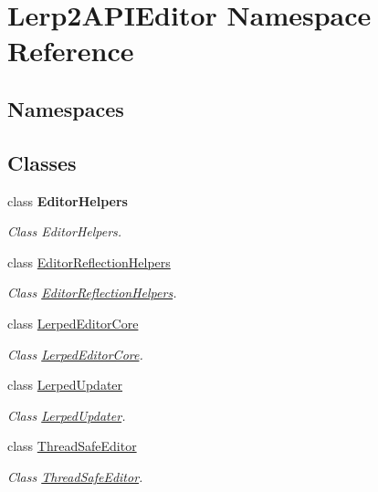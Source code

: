 \hypertarget{namespace_lerp2_a_p_i_editor}{}\section{Lerp2\+A\+P\+I\+Editor Namespace Reference}
\label{namespace_lerp2_a_p_i_editor}
\subsection*{Namespaces}
\begin{DoxyCompactItemize}
\end{DoxyCompactItemize}
\subsection*{Classes}
\begin{DoxyCompactItemize}
\item 
class {\bfseries Editor\+Helpers}
\begin{DoxyCompactList}\small\item\em Class Editor\+Helpers. \end{DoxyCompactList}\item 
class \hyperlink{class_lerp2_a_p_i_editor_1_1_editor_reflection_helpers}{Editor\+Reflection\+Helpers}
\begin{DoxyCompactList}\small\item\em Class \hyperlink{class_lerp2_a_p_i_editor_1_1_editor_reflection_helpers}{Editor\+Reflection\+Helpers}. \end{DoxyCompactList}\item 
class \hyperlink{class_lerp2_a_p_i_editor_1_1_lerped_editor_core}{Lerped\+Editor\+Core}
\begin{DoxyCompactList}\small\item\em Class \hyperlink{class_lerp2_a_p_i_editor_1_1_lerped_editor_core}{Lerped\+Editor\+Core}. \end{DoxyCompactList}\item 
class \hyperlink{class_lerp2_a_p_i_editor_1_1_lerped_updater}{Lerped\+Updater}
\begin{DoxyCompactList}\small\item\em Class \hyperlink{class_lerp2_a_p_i_editor_1_1_lerped_updater}{Lerped\+Updater}. \end{DoxyCompactList}\item 
class \hyperlink{class_lerp2_a_p_i_editor_1_1_thread_safe_editor}{Thread\+Safe\+Editor}
\begin{DoxyCompactList}\small\item\em Class \hyperlink{class_lerp2_a_p_i_editor_1_1_thread_safe_editor}{Thread\+Safe\+Editor}. \end{DoxyCompactList}\end{DoxyCompactItemize}
